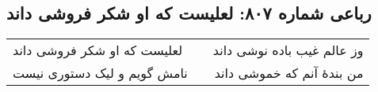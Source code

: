 \begin{center}
\section*{رباعی شماره ۸۰۷: لعلیست که او شکر فروشی داند}
\label{sec:0807}
\begin{longtable}{l p{0.5cm} r}
لعلیست که او شکر فروشی داند
&&
وز عالم غیب باده نوشی داند
\\
نامش گویم و لیک دستوری نیست
&&
من بندهٔ آنم که خموشی داند
\\
\end{longtable}
\end{center}
